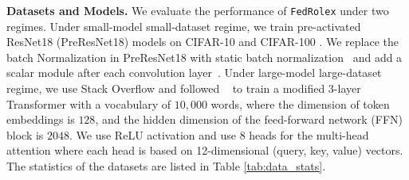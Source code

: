 \documentclass{article}
\newcommand{\rebuttal}[1]{\textcolor{black}{#1}}
\begin{document}
\textbf{Datasets and Models.}
We evaluate the performance of \texttt{FedRolex} under two regimes. Under small-model small-dataset regime, we train pre-activated ResNet18 (PreResNet18) models \citep{he2016deep} on CIFAR-10 and CIFAR-100 \citep{krizhevsky2009learning}. We replace the batch Normalization in PreResNet18 with static batch normalization~\citep{diao2020heterofl, andreux2020siloed} and add a scalar module after each convolution layer~\citep{diao2020heterofl}.
%
Under large-model large-dataset regime, we use Stack Overflow \citep{authors2019tensorflow} and followed ~\citep{wang2021field} to train a modified 3-layer Transformer \cite{vaswani2017attention} with a vocabulary of $10,000$ words, where the dimension of token embeddings is $128$, and the hidden dimension of the feed-forward network (FFN) block is $2048$. We use ReLU activation and use $8$ heads for the multi-head attention where each head is based on 12-dimensional (query, key, value) vectors.
%
The statistics of the datasets are listed in Table \ref{tab:data_stats}.

%
\vspace{-0mm}
\begin{table}[h]
\centering
\caption{Dataset statistics.}
\label{tab:data_stats}
\vspace{-0mm}
\end{table}
\end{document}
